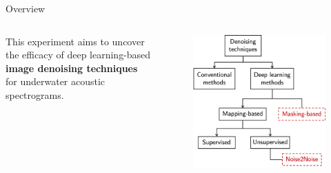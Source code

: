 \documentclass[]{beamer}
\begin{document}
\begin{frame}{Overview}
    \begin{columns}
        \begin{column}{0.42\textwidth}
            \small This experiment aims to uncover the efficacy of deep learning-based \textbf{image denoising techniques} for underwater acoustic spectrograms.
        \end{column} 
        \begin{column}{0.58\textwidth}
            \begin{figure}
                \centering
                \includegraphics[width=\linewidth]{img/denoising_family.png}
            \end{figure}
        \end{column} 
    \end{columns}
    
\end{frame}
\end{document}
